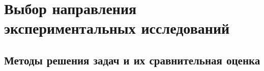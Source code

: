 \section{Выбор направления экспериментальных исследований}

\subsection{Методы решения задач и их сравнительная оценка}
